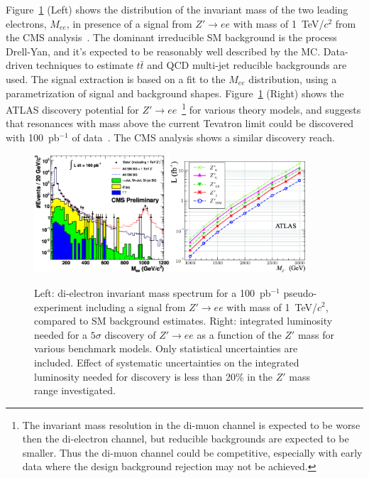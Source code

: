 \documentclass{cmspaper}
\begin{document}
Figure~\ref{fig:MeeAndZPrimeDisc} (Left) shows the distribution of 
the invariant mass of the two leading electrons, $M_{ee}$, in presence of 
a signal from $Z' \rightarrow ee$ with mass of 1~TeV/$c^2$
from the CMS analysis~\cite{HEEPNOTE}. The dominant irreducible SM background 
is the process Drell-Yan, and it's expected to be 
reasonably well described by the MC. Data-driven techniques to estimate $t\bar{t}$ and QCD multi-jet
reducible backgrounds are used. The signal extraction is based on a fit 
to the $M_{ee}$ distribution, using a parametrization of signal and 
background shapes. Figure~\ref{fig:MeeAndZPrimeDisc} (Right)
shows the ATLAS discovery potential for 
$Z' \rightarrow ee$~\footnote{The invariant 
mass resolution in the di-muon channel is expected to be 
worse then the di-electron channel, 
but reducible backgrounds are expected to be smaller. 
Thus the di-muon channel could be competitive, 
especially with early data where the design background rejection may not be 
achieved.} for various theory 
models, and suggests that resonances with mass 
above the current Tevatron limit could be discovered with 
100~pb$^{-1}$ of data~\cite{DiLepResonancesATLAS}. 
The CMS analysis shows a similar discovery reach.

\begin{figure}[htbp] 
\centering
\includegraphics[width=0.45\textwidth]{st_mass_all_withZPrime_ALLTOPO.eps}\includegraphics[width=0.45\textwidth]{fig9L.eps}
\caption{Left: di-electron invariant mass spectrum for a 
100~pb$^{-1}$ pseudo-experiment including a signal from 
$Z' \rightarrow ee$ with mass of 1~TeV/$c^2$, 
compared to SM background estimates. Right: integrated 
luminosity needed for a $5\sigma$ discovery of $Z' \rightarrow ee$
as a function of the $Z'$ mass for various benchmark models. Only 
statistical uncertainties are included. 
Effect of systematic uncertainties on the integrated luminosity 
needed for discovery is less than 20\% in the $Z'$ mass
range investigated.}
\label{fig:MeeAndZPrimeDisc}
\end{figure}
\end{document}

